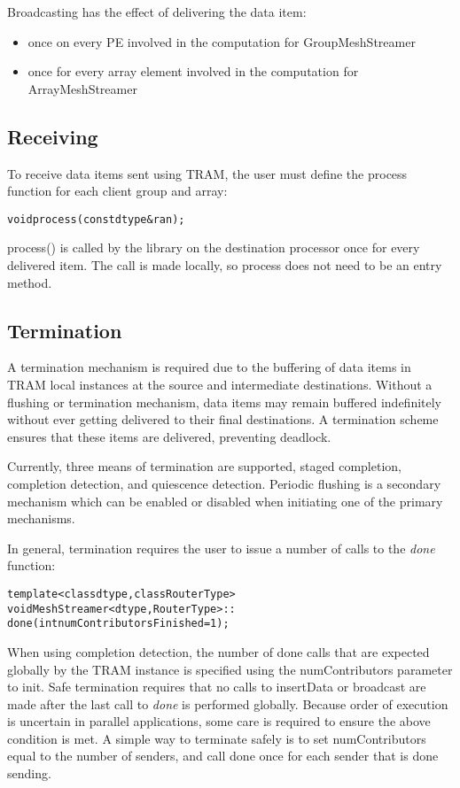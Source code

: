 Broadcasting has the effect of delivering the data item:
\begin{itemize}
\item {once on every PE involved in the computation for GroupMeshStreamer}
\item {once for every array element involved in the computation for
       ArrayMeshStreamer}
\end{itemize}


\subsection{Receiving}

To receive data items sent using TRAM, the user must define
the process function for each client group and array:

\begin{alltt}
void process(const dtype  &ran);
\end{alltt}

process() is called by the library on the destination processor once for every
delivered item. The call is made locally, so process does not need to be an
entry method.

\subsection{Termination}

A termination mechanism is required due to the buffering of data items
in TRAM local instances at the source and intermediate
destinations. Without a flushing or termination mechanism, data items
may remain buffered indefinitely without ever getting delivered to
their final destinations. A termination scheme ensures that these
items are delivered, preventing deadlock.

Currently, three means of termination are supported, staged completion,
completion detection, and quiescence detection. Periodic flushing is a secondary
mechanism which can be enabled or disabled when initiating one of the primary
mechanisms.

In general, termination requires the user to issue a number of calls
to the \emph{done} function:
\begin{alltt}
template <class dtype, class RouterType>
void MeshStreamer<dtype, RouterType>::
done(int numContributorsFinished = 1);
\end{alltt}
When using completion detection, the number of done calls that are
expected globally by the TRAM instance is specified using the
numContributors parameter to init. Safe termination requires that no
calls to insertData or broadcast are made after the last call to
\emph{done} is performed globally. Because order of execution is
uncertain in parallel applications, some care is required to ensure
the above condition is met. A simple way to terminate safely is to set
numContributors equal to the number of senders, and call done once for
each sender that is done sending.

